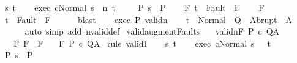 \begin{isabellebody}
\ s\ t\isanewline
\ \ \isamarkupfalse%
\ exec{\isacharcolon}\ {\isachardoublequoteopen}{\isasymGamma}{\isasymturnstile}{\isasymlangle}c{\isacharcomma}Normal\ s\ {\isasymrangle}\ {\isacharequal}n{\isasymRightarrow}\ t{\isachardoublequoteclose}\ \isanewline
\ \ \isamarkupfalse%
\ P{\isacharcolon}\ {\isachardoublequoteopen}s\ {\isasymin}\ P{\isachardoublequoteclose}\isanewline
\ \ \isamarkupfalse%
\ F{\isacharcolon}\ {\isachardoublequoteopen}t\ {\isasymnotin}\ Fault\ {\isacharbackquote}\ F{\isacharprime}{\isachardoublequoteclose}\isanewline
\ \ \isamarkupfalse%
\ F{\isacharprime}\ \isamarkupfalse%
\ {\isachardoublequoteopen}t\ {\isasymnotin}\ Fault\ {\isacharbackquote}\ F{\isachardoublequoteclose}\isanewline
\ \ \ \ \isamarkupfalse%
\ blast\isanewline
\ \ \isamarkupfalse%
\ exec\ P\ validn\isanewline
\ \ \isamarkupfalse%
\ {\isachardoublequoteopen}t\ {\isasymin}\ Normal\ {\isacharbackquote}\ Q\ {\isasymunion}\ Abrupt\ {\isacharbackquote}\ A{\isachardoublequoteclose}\isanewline
\ \ \ \ \isamarkupfalse%
\ {\isacharparenleft}auto\ simp\ add{\isacharcolon}\ nvalid{\isacharunderscore}def{\isacharparenright}\isanewline
{}\isamarkupfalse%
%
\endisatagproof
{\isafoldproof}%
%
\isadelimproof
\isanewline
%
\endisadelimproof
\isanewline
{}\isamarkupfalse%
\ valid{\isacharunderscore}augment{\isacharunderscore}Faults{\isacharcolon}\isanewline
\ \ \ validn{\isacharcolon}{\isachardoublequoteopen}{\isasymGamma}{\isasymTurnstile}\isactrlbsub {\isacharslash}F\isactrlesub \ P\ c\ Q{\isacharcomma}A{\isachardoublequoteclose}\isanewline
\ \ \ F{\isacharprime}{\isacharcolon}\ {\isachardoublequoteopen}F\ {\isasymsubseteq}\ F{\isacharprime}{\isachardoublequoteclose}\isanewline
\ \ \ {\isachardoublequoteopen}{\isasymGamma}{\isasymTurnstile}\isactrlbsub {\isacharslash}F{\isacharprime}\isactrlesub \ P\ c\ Q{\isacharcomma}A{\isachardoublequoteclose}\isanewline
%
\isadelimproof
%
\endisadelimproof
%
\isatagproof
{}\isamarkupfalse%
\ {\isacharparenleft}rule\ validI{\isacharparenright}\isanewline
\ \ \isamarkupfalse%
\ s\ t\isanewline
\ \ \isamarkupfalse%
\ exec{\isacharcolon}\ {\isachardoublequoteopen}{\isasymGamma}{\isasymturnstile}{\isasymlangle}c{\isacharcomma}Normal\ s\ {\isasymrangle}\ {\isasymRightarrow}\ t{\isachardoublequoteclose}\ \isanewline
\ \ \isamarkupfalse%
\ P{\isacharcolon}\ {\isachardoublequoteopen}s\ {\isasymin}\ P{\isachardoublequoteclose}\isanewline

\end{isabellebody}
